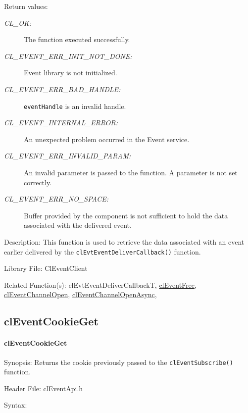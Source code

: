 \begin{flushleft}
\begin{Desc}
\begin{description}
 \end{description}
\end{Desc}
\begin{Desc}
\item[Return values:]
\begin{description}
\item[{\em CL\_\-OK:}]The function executed successfully. 
\item[{\em CL\_\-EVENT\_\-ERR\_\-INIT\_\-NOT\_\-DONE:}]Event library is not initialized. 
\item[{\em CL\_\-EVENT\_\-ERR\_\-BAD\_\-HANDLE:}]{\tt{eventHandle}} is an invalid handle. 
\item[{\em CL\_\-EVENT\_\-INTERNAL\_\-ERROR:}]An unexpected problem occurred in the Event service. 
\item[{\em CL\_\-EVENT\_\-ERR\_\-INVALID\_\-PARAM:}]An invalid parameter is passed to the function. A parameter is not set correctly.
\item[{\em CL\_\-EVENT\_\-ERR\_\-NO\_\-SPACE:}]Buffer provided by the component is not sufficient to hold the data associated with the delivered event.
\end{description}
\end{Desc}
\begin{Desc}
\item[Description:]This function is used to retrieve the data associated with an event earlier delivered by the {\tt{clEvtEventDeliverCallback()}}
function.
\end{Desc}
\begin{Desc}
\item[Library File:]Cl\-Event\-Client\end{Desc}
\begin{Desc}
\item[Related Function(s):]cl\-Evt\-Event\-Deliver\-Callback\-T, \hyperlink{pageem108}{cl\-Event\-Free}, \hyperlink{pageem103}{cl\-Event\-Channel\-Open},
\hyperlink{pageem104}{cl\-Event\-Channel\-Open\-Async}, \end{Desc}
\newpage


\subsection{clEventCookieGet}
\hypertarget{pageem112}{}\paragraph{cl\-Event\-Cookie\-Get}\label{pageem112}
\begin{Desc}
\item[Synopsis:]Returns the cookie previously passed to the {\tt{clEventSubscribe()}} function.\end{Desc}
\begin{Desc}
\item[Header File:]clEventApi.h\end{Desc}
\begin{Desc}
\item[Syntax:]


\end{Desc}
\end{flushleft}
